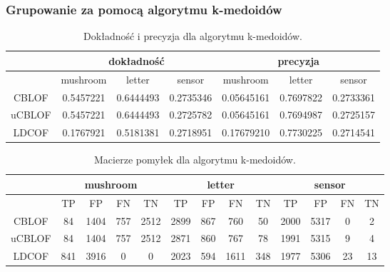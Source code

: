 \documentclass[11pt,a4paper,twoside]{article}
\begin{document}
\subsubsection{Grupowanie za pomocą algorytmu k-medoidów }


\begin{table}[H]
\centering
\caption{Dokładność i precyzja dla algorytmu k-medoidów.}
\label{accPrec_kmedoid}
\begin{tabular}{|*{7}{c|}}
\hline
 & \multicolumn{3}{c|}{dokładność} & \multicolumn{3}{c|}{precyzja} \\\hline
 & mushroom & letter & sensor & mushroom & letter & sensor \\\hline
 CBLOF &      0.5457221  &     0.6444493     &    0.2735346  &    0.05645161 &   0.7697822   &    0.2733361  \\\hline
 uCBLOF &    0.5457221   &     0.6444493    &   0.2725782   &  0.05645161   &   0.7694987  &    0.2725157  \\\hline
 LDCOF &     0.1767921   &      0.5181381   &    0.2718951   &   0.17679210  &   0.7730225 &     0.2714541 \\\hline
\end{tabular}
\end{table}

\begin{table}[H]
\centering
\caption{Macierze pomyłek dla algorytmu k-medoidów.}
\label{confMatrix_kmedoid}
\begin{tabular}{|*{13}{c|}}
\hline
 & \multicolumn{4}{c|}{mushroom} & \multicolumn{4}{c|}{letter} & \multicolumn{4}{c|}{sensor} \\\hline
 & TP & FP & FN & TN  & TP & FP & FN & TN  & TP & FP & FN & TN \\\hline
 CBLOF    &    84     &   1404     &   757    &   2512    &     2899   &   867  &  760   & 50  & 2000  &   5317   &   0   &   2        \\\hline
 uCBLOF &    84      &    1404    &   757    &    2512   &      2871  &   860 &   767   &78  &  1991 &    5315 &    9   &   4     \\\hline
 LDCOF   &   841     &   3916    &    0       &     0        &      2023  &    594 &  1611   & 348  &   1977  &   5306   &   23  &   13  \\\hline
\end{tabular}
\end{table}
\end{document}
